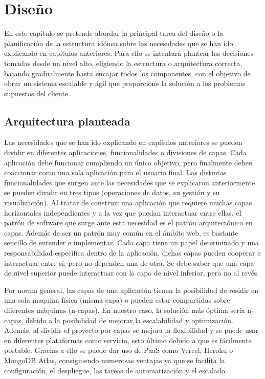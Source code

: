 \chapter{Diseño}\label{ch:diseño}
En este capítulo se pretende abordar la principal tarea del diseño o la planificación de la estructura idónea sobre las necesidades que se han ido explicando en capítulos anteriores. Para ello se intentará plantear las decisiones tomadas desde un nivel alto, eligiendo la estructura o arquitectura correcta, bajando gradualmente hasta encajar todos los componentes, con el objetivo de obrar un sistema escalable y ágil que proporcione la solución a los problemas supuestos del cliente.

\section{Arquitectura planteada}
Las necesidades que se han ido explicando en capítulos anteriores se pueden dividir en diferentes aplicaciones, funcionalidades o divisiones de capas. Cada aplicación debe funcionar cumpliendo un único objetivo, pero finalmente deben coaccionar como una sola aplicación para el usuario final. Las distintas funcionalidades que surgen ante las necesidades que se explicaron anteriormente se pueden dividir en tres tipos (operaciones de datos, su gestión y su visualización). Al tratar de construir una aplicación que requiere muchas capas horizontales independientes y a la vez que puedan interactuar entre ellas, el patrón de software que surge ante esta necesidad es el patrón arquitectónico en capas. Además de ser un patrón muy común en el ámbito web, es bastante sencillo de entender e implementar. Cada capa tiene un papel determinado y una responsabilidad específica dentro de la aplicación, dichas capas pueden cooperar e interactuar entre sí, pero no dependen una de otra. Se debe saber que una capa de nivel superior puede interactuar con la capa de nivel inferior, pero no al revés. \cite{aqruitecturaMicrosoft}

\vspace{0.3cm}

Por norma general, las capas de una aplicación tienen la posibilidad de residir en una sola maquina física (misma capa) o pueden estar compartidas sobre diferentes máquinas (n-capas). En nuestro caso, la solución más óptima sería n-capas, debido a la posibilidad de mejorar la escalabilidad y optimización. Además, al dividir el proyecto por capas se mejora la flexibilidad y se puede usar en diferentes plataformas como servicio, esto último debido a que es fácilmente portable. Gracias a ello se puede dar uso de \ac{PaaS} como Vercel, Heroku o MongoDB Atlas, consiguiendo numerosas ventajas ya que se facilita la configuración, el despliegue, las tareas de automatización y el escalado.

